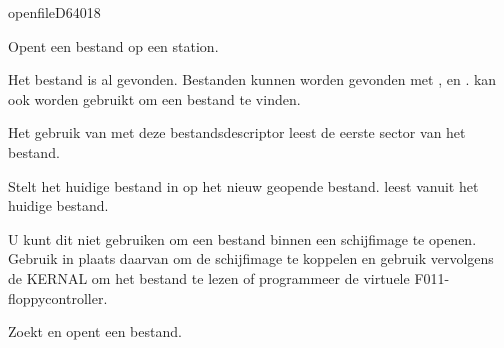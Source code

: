 \newpage
\begin{hyppotrap}{openfile}{D640}{18}

\item [Dienst:]  Opent een bestand op een station.
\item [Voorwaarden:]  Het bestand is al gevonden. Bestanden kunnen worden gevonden met ,   en .  kan ook worden  gebruikt om een bestand te vinden.
\item [Resultaten:]  
\item [Nawerkingen:]  Het gebruik van  met deze bestandsdescriptor leest de eerste sector van het bestand.
\item [Neveneffecten:]  Stelt het huidige bestand in op het nieuw geopende bestand.  leest  vanuit het huidige bestand.
\item [Foutcodes:]    
\item [Geschiedenis:]

\item [Opmerkingen:]  U kunt dit niet gebruiken om een bestand binnen een schijfimage te openen. Gebruik in plaats daarvan  om de schijfimage te koppelen en gebruik vervolgens de KERNAL om het bestand te lezen of programmeer de virtuele F011-floppycontroller.
\item [Voorbeeld:]  Zoekt en opent een bestand.
\end{hyppotrap}


